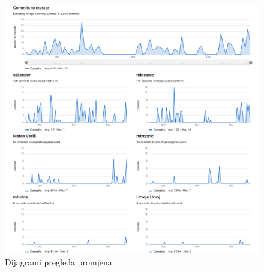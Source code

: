 		\begin{figure}[H]
					\includegraphics[scale=0.4]{figures/graf.PNG}
					\centering
					\caption{Dijagrami pregleda promjena}
					\label{fig:Dijagrami pregleda promjena}
				\end{figure}	